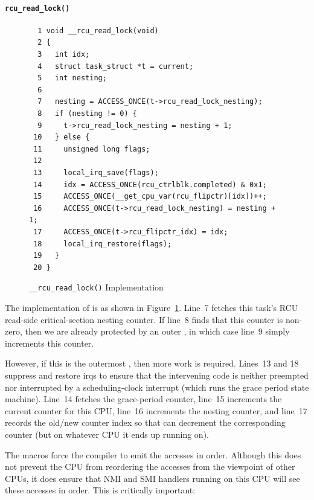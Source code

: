 \paragraph{{\tt rcu\_read\_lock()}}
\label{app:rcuimpl:rcu_read_lock()}

\begin{figure}[tbp]
{ \scriptsize
\begin{verbatim}
  1 void __rcu_read_lock(void)
  2 {
  3   int idx;
  4   struct task_struct *t = current;
  5   int nesting;
  6
  7   nesting = ACCESS_ONCE(t->rcu_read_lock_nesting);
  8   if (nesting != 0) {
  9     t->rcu_read_lock_nesting = nesting + 1;
 10   } else {
 11     unsigned long flags;
 12
 13     local_irq_save(flags);
 14     idx = ACCESS_ONCE(rcu_ctrlblk.completed) & 0x1;
 15     ACCESS_ONCE(__get_cpu_var(rcu_flipctr)[idx])++;
 16     ACCESS_ONCE(t->rcu_read_lock_nesting) = nesting + 1;
 17     ACCESS_ONCE(t->rcu_flipctr_idx) = idx;
 18     local_irq_restore(flags);
 19   }
 20 }
\end{verbatim}
}
\caption{{\tt \_\_rcu\_read\_lock()} Implementation}
\label{fig:app:rcuimpl:__rcu_read_lock() Implementation}
\end{figure}

The implementation of  is as shown in
Figure~\ref{fig:app:rcuimpl:__rcu_read_lock() Implementation}.
Line~7 fetches this task's RCU read-side critical-section nesting
counter.
If line~8 finds that this counter is non-zero,
then we are already protected by an outer
, in which case line~9 simply increments
this counter.

However, if this is the outermost ,
then more work is required.
Lines~13 and 18 suppress and restore irqs to ensure that the
intervening code is neither preempted nor interrupted by a
scheduling-clock interrupt (which runs the grace period state machine).
Line~14 fetches the grace-period counter,
line~15 increments the current counter for
this CPU, line~16 increments the nesting counter,
and line~17 records the old/new counter index so that
 can decrement the corresponding
counter (but on whatever CPU it ends up running on).

The  macros force the compiler to
emit the accesses in order.
Although this does not prevent the CPU from reordering the accesses
from the viewpoint of other CPUs, it does ensure that NMI and
SMI handlers running on this CPU will see these accesses in order.
This is critically important:

